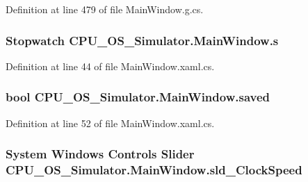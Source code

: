 Definition at line 479 of file Main\+Window.\+g.\+cs.

\hypertarget{class_c_p_u___o_s___simulator_1_1_main_window_a880dc01f7c4f093b77ace064d93be1f3}{}
\subsubsection[{s}]{\setlength{\rightskip}{0pt plus 5cm}Stopwatch C\+P\+U\+\_\+\+O\+S\+\_\+\+Simulator.\+Main\+Window.\+s\hspace{0.3cm}{\ttfamily [private]}}\label{class_c_p_u___o_s___simulator_1_1_main_window_a880dc01f7c4f093b77ace064d93be1f3}


Definition at line 44 of file Main\+Window.\+xaml.\+cs.

\hypertarget{class_c_p_u___o_s___simulator_1_1_main_window_afcd7446d65f9b9370ddf07499c2b8113}{}
\subsubsection[{saved}]{\setlength{\rightskip}{0pt plus 5cm}bool C\+P\+U\+\_\+\+O\+S\+\_\+\+Simulator.\+Main\+Window.\+saved\hspace{0.3cm}{\ttfamily [private]}}\label{class_c_p_u___o_s___simulator_1_1_main_window_afcd7446d65f9b9370ddf07499c2b8113}


Definition at line 52 of file Main\+Window.\+xaml.\+cs.

\hypertarget{class_c_p_u___o_s___simulator_1_1_main_window_a39cd3af9bb0f8a3ccd06fdd44c9ed6a3}{}
\subsubsection[{sld\+\_\+\+Clock\+Speed}]{\setlength{\rightskip}{0pt plus 5cm}System Windows Controls Slider C\+P\+U\+\_\+\+O\+S\+\_\+\+Simulator.\+Main\+Window.\+sld\+\_\+\+Clock\+Speed\hspace{0.3cm}{\ttfamily [package]}}\label{class_c_p_u___o_s___simulator_1_1_main_window_a39cd3af9bb0f8a3ccd06fdd44c9ed6a3}


